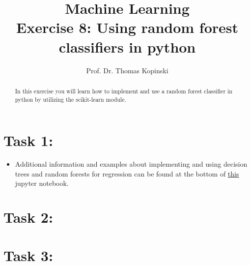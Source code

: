 \documentclass{article}
\title{Machine Learning \\ Exercise 8: Using random forest classifiers in python}
\author{Prof. Dr. Thomas Kopinski}
\begin{document}
\maketitle

\begin{abstract}
In this exercise you will learn how to implement and use a random forest classifier in python by utilizing the scikit-learn module.
\end{abstract}

\section*{Task 1: }

\begin{itemize}
    \item Additional information and examples about implementing and using decision trees and random forests for regression can be found at the bottom of  \href{https://github.com/DataScienceLabFHSWF/machine-learning-book/blob/main/notebooks/ch09/ch09.ipynb}{this} jupyter notebook.
\end{itemize}

\section*{Task 2: }

\begin{itemize}
    
\end{itemize}

\section*{Task 3: }

\begin{itemize}
   

\end{itemize}

%
%
\end{document}
